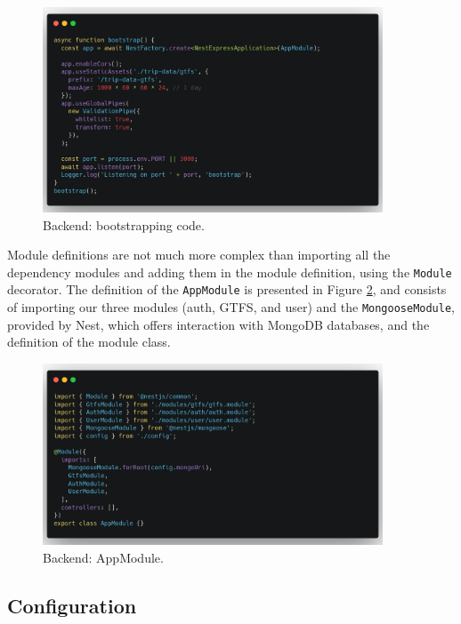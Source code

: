 \begin{figure}[htbp]
    \centering
    \includegraphics[width=0.9\textwidth]{./figures/code/be_bootstrap.png}
    \caption{Backend: bootstrapping code.}
    \label{FigBeBootstrap}
\end{figure}

Module definitions are not much more complex than importing all the dependency modules and adding them in the module definition, using the \verb|Module| decorator. The definition of the \verb|AppModule| is presented in Figure \ref{FigBeAppModule}, and consists of importing our three modules (auth, GTFS, and user) and the \verb|MongooseModule|, provided by Nest, which offers interaction with MongoDB databases, and the definition of the module class.

\begin{figure}[htbp]
    \centering
    \includegraphics[width=0.9\textwidth]{./figures/code/be_app-module.png}
    \caption{Backend: AppModule.}
    \label{FigBeAppModule}
\end{figure}

\subsection{Configuration}
\label{sec:Configuration}

